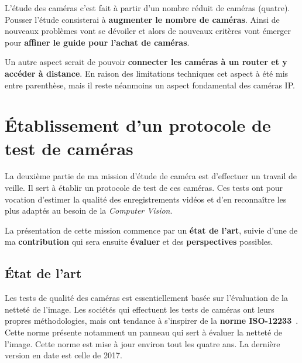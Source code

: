   L'étude des caméras c'est fait à partir d'un nombre réduit de caméras (quatre). Pousser l'étude consisterai à \textbf{augmenter le nombre de caméras}. Ainsi de nouveaux problèmes vont se dévoiler et alors de nouveaux critères vont émerger pour \textbf{affiner le guide pour l'achat de caméras}.

  Un autre aspect serait de pouvoir \textbf{connecter les caméras à un router et y accéder à distance}. En raison des limitations techniques cet aspect à été mis entre parenthèse, mais il reste néanmoins un aspect fondamental des caméras IP.

\cleardoublepage
\section{Établissement d'un protocole de test de caméras}
La deuxième partie de ma mission d'étude de caméra est d'effectuer un travail de veille. Il sert à établir un protocole de test de ces caméras. Ces tests ont pour vocation d'estimer la qualité des enregistrements vidéos et d'en reconnaître les plus adaptés au besoin de la \textit{Computer Vision}.  

La présentation de cette mission commence par un \textbf{état de l'art}, suivie d'une de ma \textbf{contribution} qui sera ensuite \textbf{évaluer} et des \textbf{perspectives} possibles.

  \subsection{État de l'art}
    Les tests de qualité des caméras est essentiellement basée sur l'évaluation de la netteté de l'image. Les sociétés qui effectuent les tests de caméras ont leurs propres méthodologies, mais ont tendance à s'inspirer de la \textbf{norme ISO-12233}~\cite{ISO12233}. Cette norme présente notamment un panneau qui sert à évaluer la netteté de l'image. Cette norme est mise à jour environ tout les quatre ans. La dernière version en date est celle de 2017.

